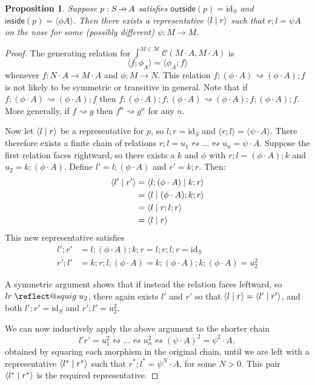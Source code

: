 \documentclass[11pt,letterpaper]{article}
\makeatletter
\theoremstyle{plain}
\newtheorem{proposition}[theorem]{Proposition}
\theoremstyle{definition}
\newcommand{\C}{\mathscr{C}}
\newcommand{\M}{\mathscr{M}}
\newcommand{\id}{\mathrm{id}}
\newcommand{\act}{\cdot}
\newcommand{\rep}[2]{{\ensuremath \left\langle #1 \mid #2 \right\rangle}}
\newcommand{\inside}{\mathsf{inside}}
\newcommand{\outside}{\mathsf{outside}}
\newcommand{\hto}{\ensuremath{\,\mathaccent\shortmid\rightarrow\,}}
\providecommand{\leftsquigarrow}{%
  \mathrel{\mathpalette\reflect@squig\relax}%
}
\newcommand{\reflect@squig}[2]{%
  \reflectbox{$\m@th#1\rightsquigarrow$}%
}
\makeatother
\begin{document}
\begin{proposition}\label{prop:onthenose}
  Suppose $p : S \hto A$ satisfies $\outside(p) = \id_S$ and $\inside(p) = \langle \phi A \rangle$. Then there exists a representative $\rep{l}{r}$ such that $r;l = \psi A$ on the nose for some (possibly different) $\psi : M \to M$.
\end{proposition}
\begin{proof}
  The generating relation for $\int^{M \in \M} \C(M \act  A, M \act  A)$ is
  \[ \langle f; \phi_A \rangle = \langle \phi_A; f \rangle \]
  whenever $f : N \act A \to M \act A$ and $\phi : M \to N$. This relation $f; (\phi \act A) \rightsquigarrow (\phi \act A); f$ is not likely to be symmetric or transitive in general. Note that if $f; (\phi \act A) \rightsquigarrow (\phi \act A); f$ then $f ;(\phi \act A) ;f; (\phi \act A) \rightsquigarrow (\phi \act A) ;f ;(\phi \act A); f$. More generally, if $f \rightsquigarrow g$ then $f^n \rightsquigarrow g^n$ for any $n$.

  Now let $\rep{l}{r}$ be a representative for $p$, so $l;r = \id_S$ and $\langle r;l \rangle = \langle \psi \act A\rangle$. There therefore exists a finite chain of relations $r;l = u_1 \leftrightsquigarrow \dots \leftrightsquigarrow u_n = \psi \act A$. Suppose the first relation faces rightward, so there exists a $k$ and $\phi$ with $r;l = (\phi \act A);k$ and $u_2 = k;(\phi \act A)$. Define $l' = l;(\phi \act A)$ and $r' = k;r$. Then:
\begin{align*}
\rep{l'}{r'}
&= \rep{l ; (\phi \act A)}{k ; r} \\
&= \rep{l}{(\phi \act A) ; k ; r} \\
&= \rep{l}{r ; l; r} \\
&= \rep{l}{r}
\end{align*}
This new representative satisfies
\begin{align*}
l';r' &= l;(\phi \act A);k;r = l;r;l;r = \id_S \\
r';l' &= k;r;l;(\phi \act A) = k;(\phi \act A);k;(\phi \act A) = u_2^2
\end{align*}

  A symmetric argument shows that if instead the relation faces leftward, so $lr \leftsquigarrow u_2$, there again exists $l'$ and $r'$ so that $\rep{l}{r} = \rep{l'}{r'}$, and both $l';r' = \id_S$ and $r';l' = u_2^2$.

  We can now inductively apply the above argument to the shorter chain \[l'r' = u_1^2 \leftrightsquigarrow \dots \leftrightsquigarrow u_n^2 \leftrightsquigarrow {(\psi \act A)}^2 = \psi^2 \act A,\] obtained by squaring each morphism in the original chain, until we are left with a representative $\rep{l^*}{r^*}$ such that $r^*;l^* = \psi^N \act A$, for some $N>0$. This pair $\rep{l^*}{r^*}$ is the required representative.
\end{proof}
\end{document}
